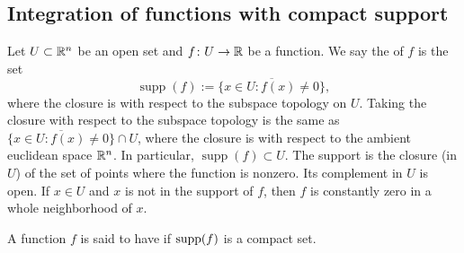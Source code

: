 \subsection{Integration of functions with compact support}

Let $U \subset {\mathbb{R}}^n$ be an open set and
$f \colon U \to {\mathbb{R}}$ be a function.  We say the
\emph{} of $f$ is the set
\begin{equation*}
\operatorname{supp} (f) :=
\overline{
\{ x \in U : f(x) \not= 0 \}
} ,
\end{equation*}
where the closure is with respect to the subspace topology on $U$.
Taking the closure with respect to the subspace
topology is the same as 
$\overline{
\{ x \in U : f(x) \not= 0 \}
} \cap U$, where the closure is with respect to the ambient euclidean space
${\mathbb{R}}^n$.
In particular,
$\operatorname{supp} (f) \subset U$.
The support is the closure (in $U$) of the set of points where the
function is nonzero.  Its complement in $U$ is open.
If $x \in U$ and $x$ is not in the support of $f$,
then
$f$ is constantly zero in a whole neighborhood of $x$.

A function $f$ is said to have \emph{}
if $\operatorname{supp}(f)$ is a compact set.

